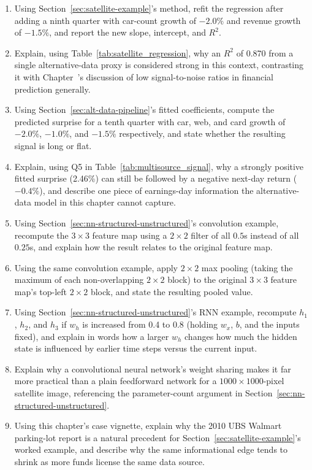 \documentclass[../ai_in_finance]{subfiles}
\begin{document}
\begin{enumerate}[exercises]
    \item Using Section~\ref{sec:satellite-example}'s method, refit the regression after adding a ninth quarter with car-count growth of $-2.0\%$ and revenue growth of $-1.5\%$, and report the new slope, intercept, and $R^2$.
    \item Explain, using Table~\ref{tab:satellite_regression}, why an $R^2$ of 0.870 from a single alternative-data proxy is considered strong in this context, contrasting it with Chapter~'s discussion of low signal-to-noise ratios in financial prediction generally.
    \item Using Section~\ref{sec:alt-data-pipeline}'s fitted coefficients, compute the predicted surprise for a tenth quarter with car, web, and card growth of $-2.0\%$, $-1.0\%$, and $-1.5\%$ respectively, and state whether the resulting signal is long or flat.
    \item Explain, using Q5 in Table~\ref{tab:multisource_signal}, why a strongly positive fitted surprise (2.46\%) can still be followed by a negative next-day return ($-0.4\%$), and describe one piece of earnings-day information the alternative-data model in this chapter cannot capture.
    \item Using Section~\ref{sec:nn-structured-unstructured}'s convolution example, recompute the $3\times3$ feature map using a $2\times2$ filter of all $0.5$s instead of all $0.25$s, and explain how the result relates to the original feature map.
    \item Using the same convolution example, apply $2\times2$ max pooling (taking the maximum of each non-overlapping $2\times2$ block) to the original $3\times3$ feature map's top-left $2\times2$ block, and state the resulting pooled value.
    \item Using Section~\ref{sec:nn-structured-unstructured}'s RNN example, recompute $h_1$, $h_2$, and $h_3$ if $w_h$ is increased from 0.4 to 0.8 (holding $w_x$, $b$, and the inputs fixed), and explain in words how a larger $w_h$ changes how much the hidden state is influenced by earlier time steps versus the current input.
    \item Explain why a convolutional neural network's weight sharing makes it far more practical than a plain feedforward network for a $1000\times1000$-pixel satellite image, referencing the parameter-count argument in Section~\ref{sec:nn-structured-unstructured}.
    \item Using this chapter's case vignette, explain why the 2010 UBS Walmart parking-lot report is a natural precedent for Section~\ref{sec:satellite-example}'s worked example, and describe why the same informational edge tends to shrink as more funds license the same data source.

\end{enumerate}
\end{document}
